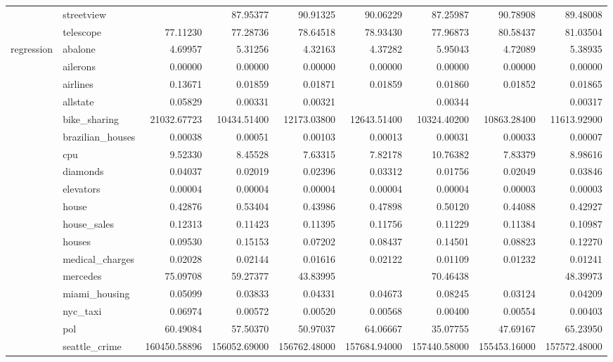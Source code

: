\begin{tabular}{llrrrrrrr}
 & streetview &  & 87.95377 & 90.91325 & 90.06229 & 87.25987 & 90.78908 & 89.48008 \\
 & telescope & 77.11230 & 77.28736 & 78.64518 & 78.93430 & 77.96873 & 80.58437 & 81.03504 \\
\multirow[c]{27}{*}{regression} & abalone & 4.69957 & 5.31256 & 4.32163 & 4.37282 & 5.95043 & 4.72089 & 5.38935 \\
 & ailerons & 0.00000 & 0.00000 & 0.00000 & 0.00000 & 0.00000 & 0.00000 & 0.00000 \\
 & airlines & 0.13671 & 0.01859 & 0.01871 & 0.01859 & 0.01860 & 0.01852 & 0.01865 \\
 & allstate & 0.05829 & 0.00331 & 0.00321 &  & 0.00344 &  & 0.00317 \\
 & bike_sharing & 21032.67723 & 10434.51400 & 12173.03800 & 12643.51400 & 10324.40200 & 10863.28400 & 11613.92900 \\
 & brazilian_houses & 0.00038 & 0.00051 & 0.00103 & 0.00013 & 0.00031 & 0.00033 & 0.00007 \\
 & cpu & 9.52330 & 8.45528 & 7.63315 & 7.82178 & 10.76382 & 7.83379 & 8.98616 \\
 & diamonds & 0.04037 & 0.02019 & 0.02396 & 0.03312 & 0.01756 & 0.02049 & 0.03846 \\
 & elevators & 0.00004 & 0.00004 & 0.00004 & 0.00004 & 0.00004 & 0.00003 & 0.00003 \\
 & house & 0.42876 & 0.53404 & 0.43986 & 0.47898 & 0.50120 & 0.44088 & 0.42927 \\
 & house_sales & 0.12313 & 0.11423 & 0.11395 & 0.11756 & 0.11229 & 0.11384 & 0.10987 \\
 & houses & 0.09530 & 0.15153 & 0.07202 & 0.08437 & 0.14501 & 0.08823 & 0.12270 \\
 & medical_charges & 0.02028 & 0.02144 & 0.01616 & 0.02122 & 0.01109 & 0.01232 & 0.01241 \\
 & mercedes & 75.09708 & 59.27377 & 43.83995 &  & 70.46438 &  & 48.39973 \\
 & miami_housing & 0.05099 & 0.03833 & 0.04331 & 0.04673 & 0.08245 & 0.03124 & 0.04209 \\
 & nyc_taxi & 0.06974 & 0.00572 & 0.00520 & 0.00568 & 0.00400 & 0.00554 & 0.00403 \\
 & pol & 60.49084 & 57.50370 & 50.97037 & 64.06667 & 35.07755 & 47.69167 & 65.23950 \\
 & seattle_crime & 160450.58896 & 156052.69000 & 156762.48000 & 157684.94000 & 157440.58000 & 155453.16000 & 157572.48000 \\

\end{tabular}
